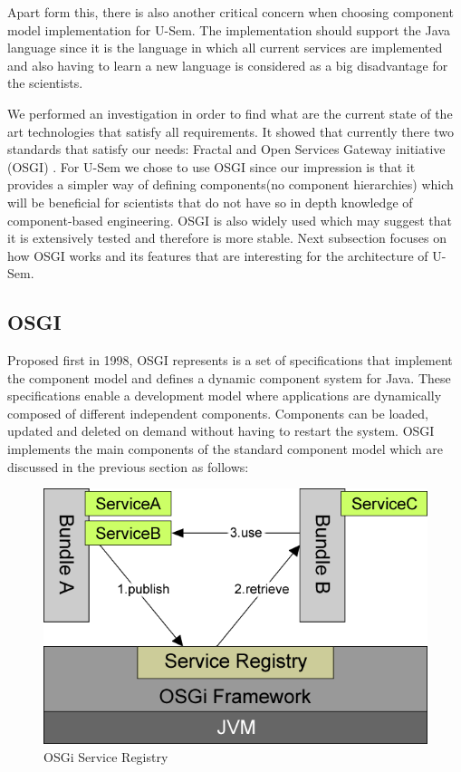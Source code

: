 Apart form this, there is also another critical concern when choosing component model implementation for U-Sem. The implementation should support the Java language since it is the language in which all current services are implemented and also having to learn a new language is considered as a big disadvantage for the scientists.

We performed an investigation in order to find what are the current state of the art technologies that satisfy all requirements. It showed that currently there two standards that satisfy our needs: Fractal \cite{Bruneton} and Open Services Gateway initiative (OSGI) \cite{OSGI}. For U-Sem we chose to use OSGI since our impression is that it provides a simpler way of defining components(no component hierarchies) which will be beneficial for scientists that do not have so in depth knowledge of component-based engineering. OSGI is also widely used\cite{Andre} which may suggest that it is extensively tested and therefore is more stable. Next subsection focuses on how OSGI works and its features that are interesting for the architecture of U-Sem.


\subsection{OSGI}

Proposed first in 1998, OSGI represents is a set of specifications that implement the component model and defines a dynamic component system for Java. These specifications enable a development model where applications are dynamically composed of different independent components. Components can be loaded, updated and deleted on demand without having to restart the system. OSGI implements the main components of the standard component model which are discussed in the previous section as follows:

\begin{figure}[h!]
  \centering
  	\includegraphics[scale=0.6]{plug-in/OSGI.png}
  \caption{OSGi Service Registry \cite{Andre}}
\end{figure}

